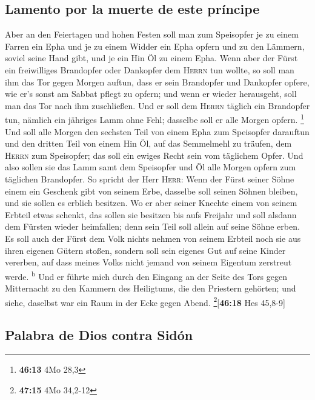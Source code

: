 \hypertarget{lamento-por-la-muerte-de-este-pruxedncipe}{%
\subsection{Lamento por la muerte de este
príncipe}\label{lamento-por-la-muerte-de-este-pruxedncipe}}

 Aber an den Feiertagen und hohen Festen soll man zum
Speisopfer je zu einem Farren ein Epha und je zu einem Widder ein Epha
opfern und zu den Lämmern, soviel seine Hand gibt, und je ein Hin Öl zu
einem Epha.  Wenn aber der Fürst ein freiwilliges
Brandopfer oder Dankopfer dem \textsc{Herrn} tun wollte, so soll man ihm
das Tor gegen Morgen auftun, dass er sein Brandopfer und Dankopfer
opfere, wie er's sonst am Sabbat pflegt zu opfern; und wenn er wieder
herausgeht, soll man das Tor nach ihm zuschließen.  Und
er soll dem \textsc{Herrn} täglich ein Brandopfer tun, nämlich ein
jähriges Lamm ohne Fehl; dasselbe soll er alle Morgen opfern.
\footnote{\textbf{46:13} 4Mo 28,3}  Und soll alle Morgen
den sechsten Teil von einem Epha zum Speisopfer darauftun und den
dritten Teil von einem Hin Öl, auf das Semmelmehl zu träufen, dem
\textsc{Herrn} zum Speisopfer; das soll ein ewiges Recht sein vom
täglichem Opfer.  Und also sollen sie das Lamm samt dem
Speisopfer und Öl alle Morgen opfern zum täglichen Brandopfer.
 So spricht der Herr \textsc{Herr}: Wenn der Fürst seiner
Söhne einem ein Geschenk gibt von seinem Erbe, dasselbe soll seinen
Söhnen bleiben, und sie sollen es erblich besitzen.  Wo
er aber seiner Knechte einem von seinem Erbteil etwas schenkt, das
sollen sie besitzen bis aufs Freijahr und soll alsdann dem Fürsten
wieder heimfallen; denn sein Teil soll allein auf seine Söhne erben.
 Es soll auch der Fürst dem Volk nichts nehmen von seinem
Erbteil noch sie aus ihren eigenen Gütern stoßen, sondern soll sein
eigenes Gut auf seine Kinder vererben, auf dass meines Volks nicht
jemand von seinem Eigentum zerstreut werde. \textsuperscript{b}
 Und er führte mich durch den Eingang an der Seite des
Tors gegen Mitternacht zu den Kammern des Heiligtums, die den Priestern
gehörten; und siehe, daselbst war ein Raum in der Ecke gegen Abend.
\footnote{\textbf{47:15} 4Mo 34,2-12}{[}\textbf{46:18} Hes 45,8-9{]}

\hypertarget{palabra-de-dios-contra-siduxf3n}{%
\subsection{Palabra de Dios contra
Sidón}\label{palabra-de-dios-contra-siduxf3n}}

